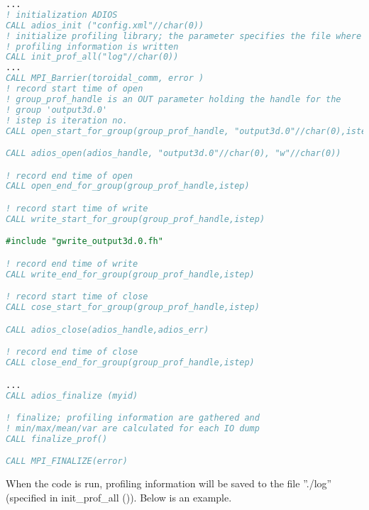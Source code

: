 \begin{lstlisting}[language=Fortran, frame=single, backgroundcolor=\color{gray85}]
...
! initialization ADIOS
CALL adios_init ("config.xml"//char(0))
! initialize profiling library; the parameter specifies the file where 
! profiling information is written
CALL init_prof_all("log"//char(0))
...
CALL MPI_Barrier(toroidal_comm, error )
! record start time of open
! group_prof_handle is an OUT parameter holding the handle for the 
! group 'output3d.0'
! istep is iteration no.
CALL open_start_for_group(group_prof_handle, "output3d.0"//char(0),istep)

CALL adios_open(adios_handle, "output3d.0"//char(0), "w"//char(0))

! record end time of open
CALL open_end_for_group(group_prof_handle,istep)

! record start time of write
CALL write_start_for_group(group_prof_handle,istep)

#include "gwrite_output3d.0.fh"

! record end time of write
CALL write_end_for_group(group_prof_handle,istep)

! record start time of close
CALL cose_start_for_group(group_prof_handle,istep)

CALL adios_close(adios_handle,adios_err)

! record end time of close
CALL close_end_for_group(group_prof_handle,istep)

...
CALL adios_finalize (myid)

! finalize; profiling information are gathered and 
! min/max/mean/var are calculated for each IO dump
CALL finalize_prof()

CALL MPI_FINALIZE(error)


\end{lstlisting}

When the code is run, profiling information will be saved to the file ''./log'' 
(specified in init\_prof\_all ()). Below is an example.

